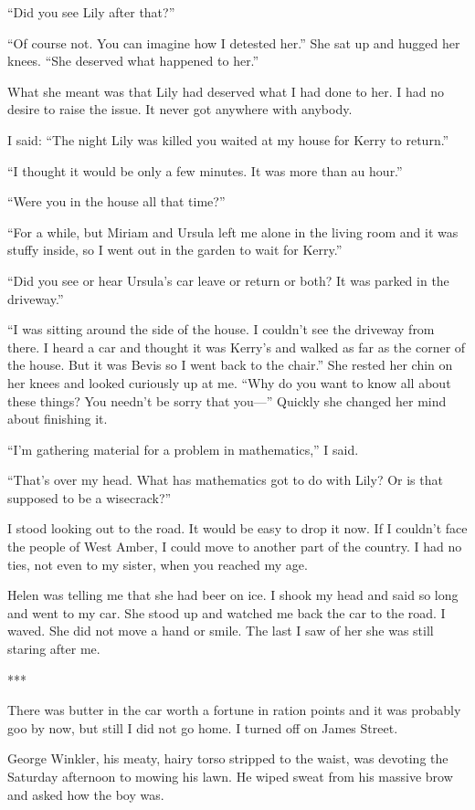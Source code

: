 \documentclass{novel}
\begin{document}
{“Did you see Lily after that?”

“Of course not. You can imagine how I detested her.” She sat up and hugged her knees. “She deserved what happened to her.”

What she meant was that Lily had deserved what I had done to her. I had no desire to raise the issue. It never got anywhere with anybody.

I said: “The night Lily was killed you waited at my house for Kerry to return.”

“I thought it would be only a few minutes. It was more than au hour.”

“Were you in the house all that time?”

“For a while, but Miriam and Ursula left me alone in the living room and it was stuffy inside, so I went out in the garden to wait for Kerry.”

“Did you see or hear Ursula’s car leave or return or both? It was parked in the driveway.”

“I was sitting around the side of the house. I couldn’t see the driveway from there. I heard a car and thought it was Kerry’s and walked as far as the corner of the house. But it was Bevis so I went back to the chair.” She rested her chin on her knees and looked curiously up at me. “Why do you want to know all about these things? You needn’t be sorry that you—” Quickly she changed her mind about finishing it.

“I’m gathering material for a problem in mathematics,” I said.

“That’s over my head. What has mathematics got to do with Lily? Or is that supposed to be a wisecrack?”

I stood looking out to the road. It would be easy to drop it now. If I couldn’t face the people of West Amber, I could move to another part of the country. I had no ties, not even to my sister, when you reached my age.

Helen was telling me that she had beer on ice. I shook my head and said so long and went to my car. She stood up and watched me back the car to the road. I waved. She did not move a hand or smile. The last I saw of her she was still staring after me.

***

There was butter in the car worth a fortune in ration points and it was probably goo by now, but still I did not go home. I turned off on James Street.

George Winkler, his meaty, hairy torso stripped to the waist, was devoting the Saturday afternoon to mowing his lawn. He wiped sweat from his massive brow and asked how the boy was.

}
\end{document}
